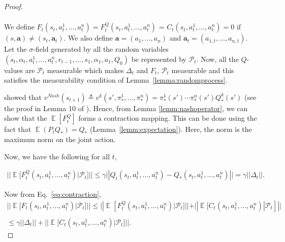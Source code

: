 \documentclass[jair, twoside,11pt,theapa]{article}
\DeclareMathOperator{\E}{\mathbb{E}}
\begin{document}
\begin{proof}
\begin{equation}
\begin{array}{l}
     \end{array}{}
\end{equation}{}

\noindent We define  $F_t(s_t,a_t^1,\ldots,a_t^n) = F_t^{Q}(s_t,a_t^1,\ldots,a_t^n)$ = $C_t(s_t,a_t^1,\ldots,a_t^n) = 0 $ if $(s,\boldsymbol{a}) \neq (s_t, \boldsymbol{a}_t) $. We also define $\boldsymbol{a} = (a_1, \ldots, a_n)$ and $\boldsymbol{a}_t = (a_{1,t}, \ldots, a_{n,t})$. Let the $\sigma$-field generated by all the random variables $ (s_t, \alpha_t, a^1_t, \ldots, a^n_t, r_{t-1}, \ldots, s_1, \alpha_1, a_1, Q_0 )$ be represented by $\mathscr{P}_t$. Now, all the $Q$-values are $\mathscr{P}_t$ measurable which makes $\Delta_t$ and $F_t$, $\mathscr{P}_t$ measurable and this satisfies the measurability condition of Lemma~\ref{lemma:randomprocess}. 

\citet{hu2003nash} showed that $v^{Nash}(s_{t+1}) \triangleq v^{k}(s', \pi^1_*, \ldots, \pi^n_*) = \pi^1_*(s') \cdots \pi^n_{*}(s') Q^k_*(s')$ (see the proof in Lemma 10 of \cite{hu2003nash}). Hence, from Lemma \ref{lemm:nashoperator}, we can show that the $\E[F^{Q}_t]$ forms a contraction mapping. This can be done using the fact that $\E(P_t Q_*) = Q_*$ (Lemma~\ref{lemm:expectation}). Here, the norm is the maximum norm on the joint action. 

Now, we have the following for all $t$,


\begin{equation}
    \begin{array}{l}
         ||\E[F_t^Q(s_t,a_t^1,\ldots,a_t^n) | \mathscr{P}_t] || \leq \gamma||Q_t(s_t,a_t^1,\ldots,a_t^n) 
         - Q_*(s_t,a_t^1,\ldots,a_t^n) || = \gamma||\Delta_t||.
    \end{array}{}
\end{equation}

\noindent Now from Eq.~\ref{eq:contraction},
\begin{equation}
    \begin{array}{l}
         ||\E[F_t(s_t,a_t^1,\ldots,a_t^n) | \mathscr{P}_t] || \leq
         
         ||\E[ F_t^{Q}(s_t,a_t^1,\ldots,a_t^n) | \mathscr{P}_t] ||
         
        +  ||\E [C_t (s_t,a_t^1,\ldots,a_t^n) | \mathscr{P}_t] ||
         \\ \\
        \leq \gamma ||\Delta_t || + || \E[C_t(s_t,a_t^1,\ldots,a_t^n)|\mathscr{P}_t]||. 
    \end{array}
\end{equation}


\end{proof}
\end{document}
